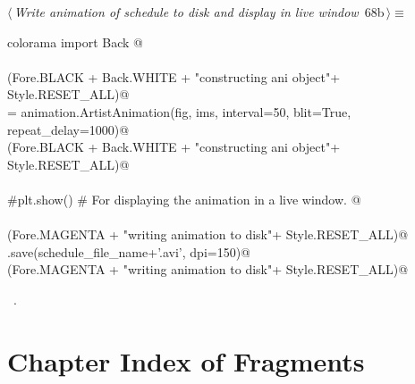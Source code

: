 \documentclass[11.5pt]{report}
\begin{document}
\vspace{-0.8cm} \newchunk


\begin{flushleft} \small\label{scrap98}\raggedright\small
{} $\langle\,${\itshape Write animation of schedule to disk and display in live window}\nobreak\ {\footnotesize {68b}}$\,\rangle\equiv$
\vspace{-1ex}
\begin{list}{}{} \item
\mbox{}\verb@from colorama import Back @\\
\mbox{}\verb@@\\
\mbox{}\verb@debug(Fore.BLACK + Back.WHITE + "\nStarted constructing ani object"+ Style.RESET_ALL)@\\
\mbox{}\verb@ani = animation.ArtistAnimation(fig, ims, interval=50, blit=True, repeat_delay=1000)@\\
\mbox{}\verb@debug(Fore.BLACK + Back.WHITE + "\nFinished constructing ani object"+ Style.RESET_ALL)@\\
\mbox{}\verb@@\\
\mbox{}\verb@#plt.show() # For displaying the animation in a live window. @\\
\mbox{}\verb@@\\
\mbox{}\verb@debug(Fore.MAGENTA + "\nStarted writing animation to disk"+ Style.RESET_ALL)@\\
\mbox{}\verb@ani.save(schedule_file_name+'.avi', dpi=150)@\\
\mbox{}\verb@debug(Fore.MAGENTA + "\nFinished writing animation to disk"+ Style.RESET_ALL)@\\
\mbox{}\verb@@{\NWsep}
\end{list}
\vspace{-1.5ex}
\footnotesize
\begin{list}{}{\setlength{\itemsep}{-\parsep}\setlength{\itemindent}{-\leftmargin}}
\item \NWtxtMacroRefIn\ .

\item{}
\end{list}
\vspace{4ex}
\end{flushleft}

\section{Chapter Index of Fragments}
\end{document}
